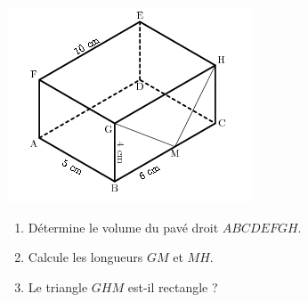 
\includegraphics[scale=1]{RepS-38.png} 
\begin{enumerate}
\item Détermine le volume du pavé droit $ABCDEFGH$.
\item Calcule les longueurs $GM$ et $MH$.
\item Le triangle $GHM$ est-il rectangle ?
\end{enumerate}

